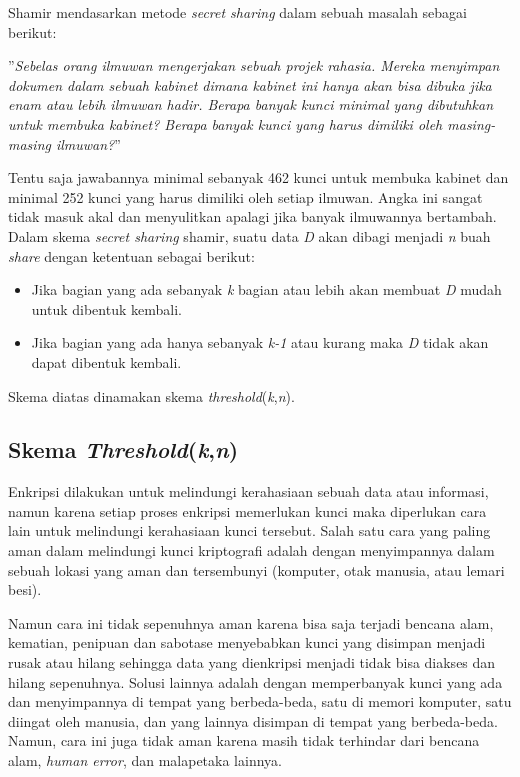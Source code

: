 Shamir mendasarkan metode \textit{secret sharing} dalam sebuah masalah sebagai berikut:
\begin{center}
''\textit{Sebelas orang ilmuwan mengerjakan sebuah projek rahasia. Mereka menyimpan dokumen dalam sebuah kabinet dimana kabinet ini hanya akan bisa dibuka jika enam atau lebih ilmuwan hadir. Berapa banyak kunci minimal yang dibutuhkan untuk membuka kabinet? Berapa banyak kunci yang harus dimiliki oleh masing-masing ilmuwan?}''
\end{center}

Tentu saja jawabannya minimal sebanyak 462 kunci untuk membuka kabinet dan minimal 252 kunci yang harus dimiliki oleh setiap ilmuwan. Angka ini sangat tidak masuk akal dan menyulitkan apalagi jika banyak ilmuwannya bertambah.
Dalam skema \textit{secret sharing} shamir, suatu data \textit{D} akan dibagi menjadi \textit{n} buah \textit{share} dengan ketentuan sebagai berikut:
	\begin{itemize}
		\item Jika bagian yang ada sebanyak \textit{k} bagian atau lebih akan membuat \textit{D} mudah untuk dibentuk kembali.
		\item Jika bagian yang ada hanya sebanyak \textit{k-1} atau kurang maka \textit{D} tidak akan dapat dibentuk kembali.
\end{itemize}
Skema diatas dinamakan skema \textit{threshold}(\textit{k},\textit{n}).

\subsection{Skema \textit{Threshold}(\textit{k},\textit{n})}
Enkripsi dilakukan untuk melindungi kerahasiaan sebuah data atau informasi, namun karena setiap proses enkripsi memerlukan kunci maka diperlukan cara lain untuk melindungi kerahasiaan kunci tersebut. Salah satu cara yang paling aman dalam melindungi kunci kriptografi adalah dengan menyimpannya dalam sebuah lokasi yang aman dan tersembunyi (komputer, otak manusia, atau lemari besi).

Namun cara ini tidak sepenuhnya aman karena bisa saja terjadi bencana alam, kematian, penipuan dan sabotase menyebabkan kunci yang disimpan menjadi rusak atau hilang sehingga data yang dienkripsi menjadi tidak bisa diakses dan hilang sepenuhnya. Solusi lainnya adalah dengan memperbanyak kunci yang ada dan menyimpannya di tempat yang berbeda-beda, satu di memori komputer, satu diingat oleh manusia, dan yang lainnya disimpan di tempat yang berbeda-beda. Namun, cara ini juga tidak aman karena masih tidak terhindar dari bencana alam, \textit{human error}, dan malapetaka lainnya.


